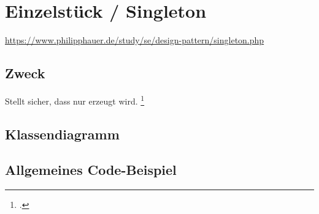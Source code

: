 \documentclass{lehramt-informatik-haupt}
\begin{document}

\chapter{Einzelstück / Singleton}

\begin{quellen}
\item \cite{wiki:singleton}
\item \url{https://www.philipphauer.de/study/se/design-pattern/singleton.php}
\item \cite[Seite 109-115]{gof}
\item \cite[Kapitel 8.3.1, Seite 247-249]{schatten}
\item \cite[Kapitel 3.4 Seite 38-43]{eilebrecht}
\item \cite[Kapitel 1, Seite 1-17]{siebler}
\end{quellen}

\section{Zweck}

Stellt sicher, dass nur  erzeugt
wird.
\footcite[Seite 38]{eilebrecht}

%

\section{Klassendiagramm}


%

\section{Allgemeines Code-Beispiel}


\literatur
\end{document}
